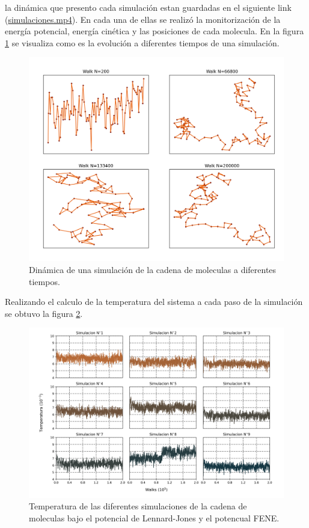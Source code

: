 la dinámica que presento cada simulación estan guardadas en el siguiente link (\href{https://github.com/giovannilopez9808/Notas_Agosto_2020/tree/master/Simulaciones/Proyecto_4/Graphics/simulaciones}{simulaciones.mp4}).
En cada una de ellas se realizó la monitorización de la energía potencial, energía cinética y las posiciones de cada molecula. En la figura \ref{fig:dim}
se visualiza como es la evolución a diferentes tiempos de una simulación.
\begin{figure}[H]
    \centering
    \hspace{-0.5cm}
    \includegraphics[scale=0.3]{../Graphics/dim.png}
    \caption{Dinámica de una simulación de la cadena de moleculas a diferentes tiempos.}
    \label{fig:dim}
\end{figure}
Realizando el calculo de la temperatura del sistema a cada paso de la simulación se obtuvo la figura \ref{fig:temp}.
\begin{figure}[H]
    \centering
    \hspace{-0.2cm}
    \includegraphics[scale=0.25]{../Graphics/temp.png}
    \caption{Temperatura de las diferentes simulaciones de la cadena de moleculas bajo el potencial de Lennard-Jones y el potencual FENE.}
    \label{fig:temp}
\end{figure}
